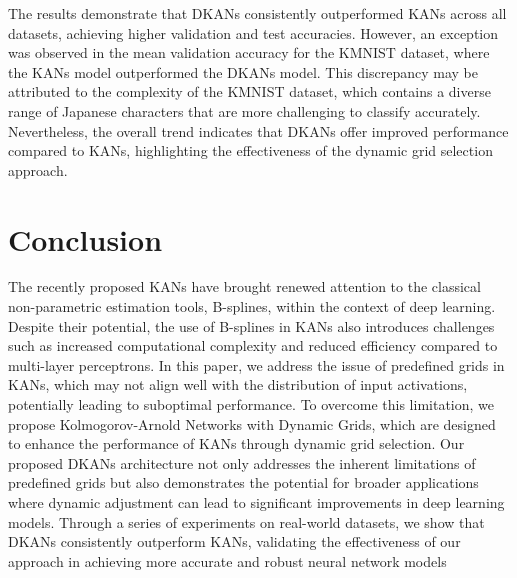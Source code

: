 \documentclass[11pt]{scrartcl}
\begin{document}
The results demonstrate that DKANs consistently outperformed KANs across all datasets, achieving higher validation and test accuracies. However, an exception was observed in the mean validation accuracy for the KMNIST dataset, where the KANs model outperformed the DKANs model. This discrepancy may be attributed to the complexity of the KMNIST dataset, which contains a diverse range of Japanese characters that are more challenging to classify accurately. Nevertheless, the overall trend indicates that DKANs offer improved performance compared to KANs, highlighting the effectiveness of the dynamic grid selection approach.

\section{Conclusion}

The recently proposed KANs have brought renewed attention to the classical non-parametric estimation tools, B-splines, within the context of deep learning. Despite their potential, the use of B-splines in KANs also introduces challenges such as increased computational complexity and reduced efficiency compared to multi-layer perceptrons.
In this paper, we address the issue of predefined grids in KANs, which may not align well with the distribution of input activations, potentially leading to suboptimal performance. To overcome this limitation, we propose Kolmogorov-Arnold Networks with Dynamic Grids, which are designed to enhance the performance of KANs through dynamic grid selection.
Our proposed DKANs architecture not only addresses the inherent limitations of predefined grids but also demonstrates the potential for broader applications where dynamic adjustment can lead to significant improvements in deep learning models. Through a series of experiments on real-world datasets, we show that DKANs consistently outperform KANs, validating the effectiveness of our approach in achieving more accurate and robust neural network models



\end{document}
